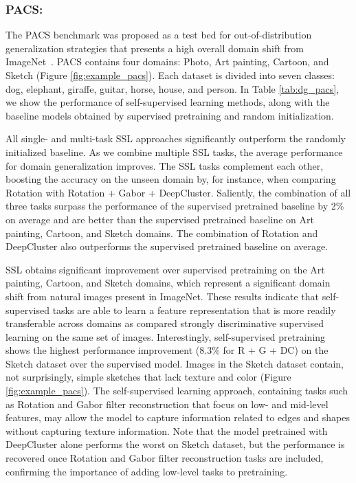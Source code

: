 \documentclass[runningheads]{llncs}
\begin{document}
\vspace{-5pt}\subsubsection{PACS:} The PACS benchmark  was proposed as a test bed for out-of-distribution generalization strategies that presents a high overall domain shift from ImageNet~\cite{li2017deeper}. 
PACS contains four domains: Photo, Art painting, Cartoon, and Sketch (Figure \ref{fig:example_pacs}). Each dataset is divided into seven classes: dog, elephant, giraffe, guitar, horse, house, and person. 
In Table \ref{tab:dg_pacs}, we show the performance of self-supervised learning methods, along with the baseline models obtained by supervised pretraining and random initialization. 

All single- and multi-task SSL approaches significantly outperform the randomly initialized baseline. 
As we combine multiple SSL tasks, the average performance for domain generalization improves. The SSL tasks complement each other, boosting the accuracy on the unseen domain by, for instance,  when comparing Rotation with Rotation + Gabor + DeepCluster. Saliently, the combination of all three tasks surpass the performance of the supervised pretrained baseline by 2\% on average and are better than the supervised pretrained baseline on Art painting, Cartoon, and Sketch domains. The combination of Rotation and DeepCluster also outperforms the supervised pretrained baseline on average. 


SSL obtains significant improvement over supervised pretraining on the Art painting, Cartoon, and Sketch domains, which represent a  significant domain shift from natural images present in ImageNet. These results indicate that self-supervised tasks are able to learn a feature representation that is more readily transferable across domains as compared strongly discriminative supervised learning on the same set of images. 
Interestingly, self-supervised pretraining shows the highest performance improvement (8.3\% for R + G + DC) on the Sketch dataset over the supervised model. Images in the Sketch dataset contain, not surprisingly, simple sketches that lack texture and color (Figure \ref{fig:example_pacs}). The self-supervised learning approach, containing tasks such as Rotation and Gabor filter reconstruction that focus on low- and mid-level features, may allow the model to capture information related to edges and shapes without capturing texture information. 
Note that the model pretrained with DeepCluster alone performs the worst on Sketch dataset, but the performance is recovered once Rotation and Gabor filter reconstruction tasks are included, confirming the importance of adding low-level tasks to pretraining. 
\end{document}
